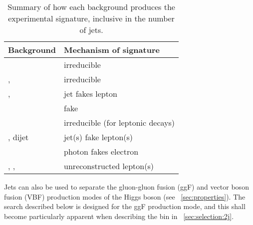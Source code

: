 \begin{table}[t]
	\begin{tabular}{l@{\hskip 0.3in}l}
		\toprule
		Background        & Mechanism of \HepProcess{\Plepton\Plepton + \met} signature \\
		\midrule
		\WW               & irreducible \\
		\ttbar, \HepProcess{\Ptop\PW} & irreducible \\
		\HepProcess{\Ptop\Pbottom}, \HepProcess{\Ptop\Pbottom\Pquark} & jet fakes lepton \\
		\DYll             & fake \met \\
		\DYtt             & irreducible (for leptonic \Ptau decays) \\
		\Wjets, dijet     & jet(s) fake lepton(s) \\
		\Wgamma           & photon fakes electron \\
		\WZ, \Wgstar, \ZZ & unreconstructed lepton(s) \\
		\bottomrule
	\end{tabular}
	\caption{Summary of how each background produces the 
	\HepProcess{\Plepton\Plepton + \met} experimental signature, inclusive in the number of 
	jets.}
	\label{tab:bkg_summary}
\end{table}

Jets can also be used to separate the gluon-gluon fusion (ggF) and vector boson fusion 
(VBF) production modes of the Higgs boson (see \Section~\ref{sec:properties}). The search 
described below is designed for the ggF production mode, and this shall become 
particularly apparent when describing the \twojet bin in \Section~\ref{sec:selection:2j}.
